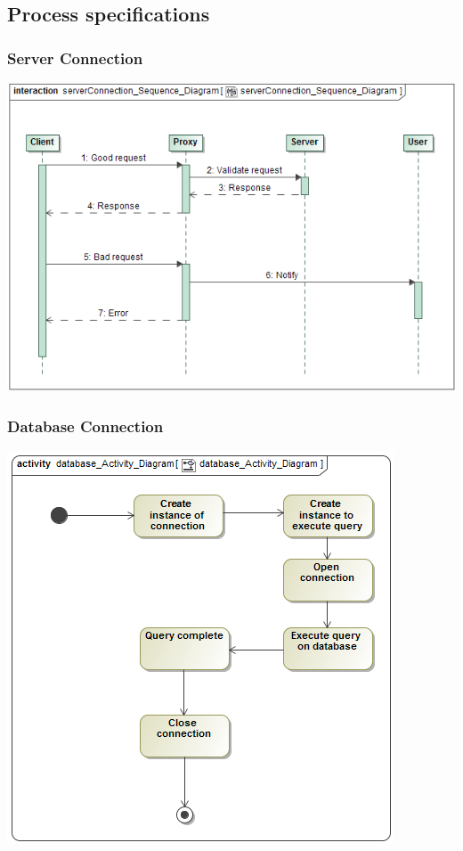 \documentclass[11pt]{article}
\begin{document}
	\subsection{Process specifications}
	
	\subsubsection{Server Connection}
	\begin{center}
		\includegraphics[width=\textwidth]{../Diagrams/SequenceDiagrams/Server_Connection_Sequence_Diagram.png}\\[0.5cm]
	\end{center}
	
	\newpage
	\subsubsection{Database Connection}
	\begin{center}
		\includegraphics[width=\textwidth]{../Diagrams/ActivityDiagrams/database_Activity_Diagram.png}\\[0.5cm]
	\end{center}
	
\end{document}
